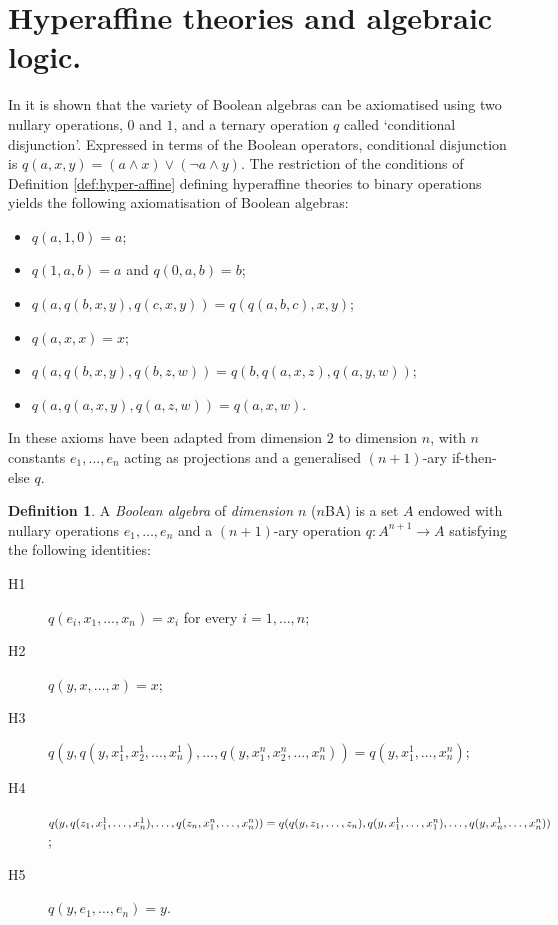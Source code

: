 \documentclass{amsart}
\numberwithin{equation}{section}
\theoremstyle{plain}
\theoremstyle{definition}
\newtheorem{definition}[theorem]{Definition}
\begin{document}
\section{Hyperaffine theories and algebraic logic.}
\label{sec:nba}
  In \cite{Dicker} it is shown that the variety of Boolean algebras can be axiomatised using two nullary operations, $0$ and $1$, and a ternary operation $q$ called `conditional disjunction'. 
Expressed in terms of the Boolean operators, conditional disjunction is $q(a,x,y)=(a \land x) \lor (\lnot a \land y)$.
  The restriction of the conditions of Definition \ref{def:hyper-affine} defining hyperaffine theories to binary operations yields the following axiomatisation of Boolean algebras:
\begin{itemize}
  \item $q(a,1,0)=a$; \hfill %
  \item $q(1,a,b)=a$ and $q(0,a,b)=b$; %
  \item $q(a, q(b,x,y), q(c,x,y))= q(q(a,b,c),x,y)$; %
  \item $q(a,x,x)=x$; %
  \item $q(a, q(b,x,y), q(b,z,w)) = q(b, q(a,x,z), q(a,y,w))$; %
  \item $q(a, q(a,x,y), q(a,z,w)) = q(a,x,w)$. %
\end{itemize}
In \cite{BS,SBLP20,BLPS18} these axioms have been adapted from dimension $2$ to
dimension $n$, with $n$ constants $e_1, \ldots, e_{n}$ acting as projections and a generalised $(n+1)$-ary if-then-else $q$. 

\begin{definition} \cite[Definition 3.7]{BS}
  A \emph{Boolean algebra} of \emph{dimension $n$} ($n$BA) is a set $A$ endowed with nullary operations $e_1, \ldots, e_n$ and a $(n+1)$-ary operation $q : A^{n+1} \to A$ satisfying the following identities:
  \begin{description}
  \item[H1] $q(e_i,x_1,\ldots,x_n) = x_i$ for every $i = 1,\ldots,n$;
  \item[H2] $q(y,x,\ldots,x) = x$; 
  \item[H3] $q(y,q(y,x^1_1,x^1_2,...,x^1_n),\ldots,q(y,x^n_1,x^n_2,\ldots,x^n_n)) = q(y,x^1_1,\ldots,x^n_n)$; 
  \item[H4] $q(y,q(z_1,x^1_1, \ldots,x^1_n),\ldots,q(z_n,x^n_1, \ldots,x^n_n)) \\
  = q(q(y,z_1, \ldots, z_n),q(y, x^1_1,\ldots,x^n_1),\ldots,q(y,x^1_n,\ldots,x^n_n))$;
  \item[H5] $q(y,e_1,...,e_n) = y$.
\end{description}
\end{definition}
\end{document}
